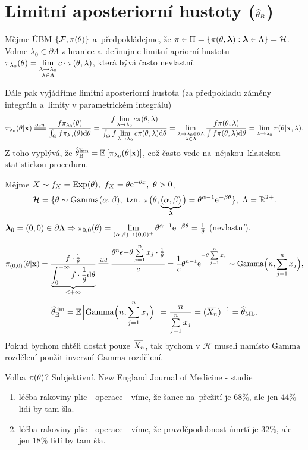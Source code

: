 \section{Limitní aposteriorní hustoty ($\widehat{\theta}_B$)}
Mějme ÚBM $\{\mathcal{F},\pi(\theta)\}$ a~předpokládejme, že $\pi\in\Pi=\{\pi(\theta,\boldsymbol{\lambda}):\boldsymbol{\lambda}\in\Lambda\}=\mathcal{H}$. Volme $\lambda_0\in\partial\Lambda$ z hranice a~definujme limitní apriorní hustotu $\pi_{\lambda_0}(\theta)=\lim\limits_{\substack{
		\lambda\to\lambda_0\\\lambda\in\Lambda	}
}c\cdot \pi(\theta,\lambda)$, která bývá často nevlastní. 

Dále pak vyjádříme limitní aposteriorní hustota (za předpokladu záměny integrálu a~limity v parametrickém integrálu) $$\pi_{\lambda_0}(\t|\textbf{x})\equal{ozn}\frac{f\pi_{\lambda_0}(\t)}{\int_\Theta f\pi_{\lambda_0}(\t)\d\t}=\frac{f\lim\limits_{\lambda\to\lambda_0}c\pi(\t,\lambda)}{\int_\Theta f\lim\limits_{\lambda\to\lambda_0}c\pi(\t,\lambda) \d\t}=\lim\limits_{\substack{
		\lambda\to\lambda_0\in\partial\Lambda\\\lambda\in\Lambda	}
}\frac{f\pi(\t,\lambda)}{\int f\pi(\t,\lambda)\d\t}=\lim\limits_{\lambda\to\lambda_0}\pi(\t|\textbf{x},\lambda).$$
Z toho vyplývá, že $\widehat{\theta}_{\mathrm{{\footnotesize B }}}^\mathrm{lim} =\mathbb{E}\left[ \pi_{\lambda_0}(\theta|\textbf{x}) \right]$, což často vede na~nějakou~klasickou statistickou proceduru.

\begin{example}
	Mějme $X\sim f_X=\mathrm{Exp}(\theta),~f_X=\theta\mathrm{e}^{-\theta x},~\theta>0$, $$\mathcal{H}=\{\theta\sim\mathrm{Gamma}(\alpha,\beta),~\text{tzn. }\pi\big(\theta,\underbrace{(\alpha,\beta)}_{\boldsymbol{\lambda}}\big)=\theta^{\alpha-1}\mathrm{e}^{-\beta\theta}\},~\Lambda=\mathbb{R}^{2+}.$$ $\boldsymbol{\lambda}_0=(0,0)\in\partial\Lambda\Rightarrow\pi_{0,0}(\theta)=\lim\limits_{(\alpha,\beta)\to(0,0)^{+}}\theta^{\alpha-1}\mathrm{e}^{-\beta\theta}=\frac{1}{\theta}$ (nevlastní).
	$$\pi_{(0,0)}(\t|\textbf{x})=\frac{f\cdot\frac{1}{\t}}{\underbrace{\int_{0}^{+\infty}f\cdot\frac{1}{\t}\d\t}_{<+\infty}}\equal{iid}\frac{\t^n e{-\t\sumjn x_j}\cdot\frac{1}{\t}}{c}=\frac{1}{c}\t^{n-1}\e{-\t\sumjn x_j}\sim\mathrm{Gamma}\Big(n,\sumjn x_j\Big),$$
	$$\htb^{\mathrm{lim}}=\E\Big[\mathrm{Gamma}\Big(n,\sumjn x_j\Big)\Big]=\frac{n}{\sumjn x_j}=\inv{(\Oxn)}=\html.$$
	Pokud bychom chtěli dostat pouze $\Oxn$, tak bychom v $\mathcal{H}$ museli namísto $\mathrm{Gamma}$ rozdělení použít inverzní $\mathrm{Gamma}$ rozdělení.
\end{example}
\begin{example}
	Volba $\pi(\theta)$? Subjektivní. New England Journal of Medicine - studie\begin{enumerate}[1)]
		\item léčba rakoviny plic - operace - víme, že šance na~přežití je 68\%, ale jen 44\% lidí by tam šla. 
		\item léčba rakoviny plic - operace - víme, že pravděpodobnost úmrtí je 32\%, ale jen 18\% lidí by tam šla. 
	\end{enumerate}
\end{example}

